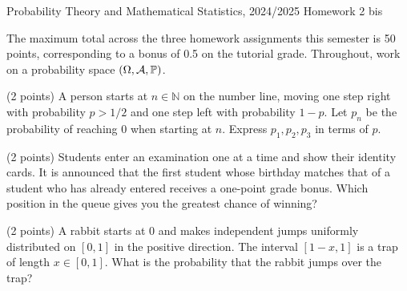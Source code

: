 \documentclass[a4paper]{report}
\begin{document}
\noindent Probability Theory and Mathematical Statistics, 2024/2025 \hfill Homework 2 bis
\hrulefill
\begin{it}The maximum total across the three homework assignments this semester is 50 points, corresponding to a bonus of 0.5 on the tutorial grade. Throughout, work on a probability space $(\Omega,\mathcal A,\P)$.\end{it}
\begin{problem} (2 points)
A person starts at $n\in\mathbb N$ on the number line, moving one step right with probability $p>1/2$ and one step left with probability $1-p$. Let $p_n$ be the probability of reaching 0 when starting at $n$. Express $p_1,p_2,p_3$ in terms of $p$.
\end{problem}
\begin{problem} (2 points)
Students enter an examination one at a time and show their identity cards. It is announced that the first student whose birthday matches that of a student who has already entered receives a one-point grade bonus. Which position in the queue gives you the greatest chance of winning?
\end{problem}
\begin{problem} (2 points)
A rabbit starts at 0 and makes independent jumps uniformly distributed on $[0,1]$ in the positive direction. The interval $[1-x,1]$ is a trap of length $x\in[0,1]$. What is the probability that the rabbit jumps over the trap?
\end{problem}
\end{document}
